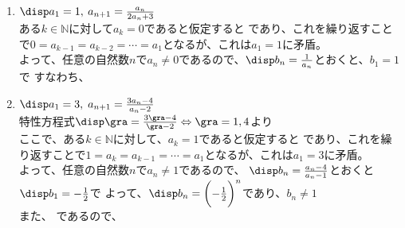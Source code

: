 \documentclass[a4paper]{ltjsarticle}
\begin{document}
\begin{question*}
\begin{ans*}
\begin{enumerate}[label=\arabic*.]
  \item $\disp a_1 = 1,\: a_{n+1} = \frac{a_n}{2a_n + 3}$ \bunsugyakusutikan \\
  ある$k\in \mathbb{N}$に対して$a_k = 0$であると仮定すると
  であり、これを繰り返すことで$0 = a_{k-1} = a_{k-2} = \cdots = a_1$となるが、これは$a_1 = 1$に矛盾。\\
  よって、任意の自然数$n$で$a_n \neq 0$であるので、$\disp b_n = \frac{1}{a_n}$とおくと、$b_1 = 1$で
  すなわち、

  \item $\disp a_1 = 3,\; a_{n+1} = \frac{3a_n-4}{a_n-2}$ \bunsutokusei \\
  特性方程式$\disp \gra =\frac{3\gra - 4}{\gra - 2} \Leftrightarrow \gra = 1,4$より \\
  ここで、ある$k\in \mathbb{N}$に対して、$a_k = 1$であると仮定すると
  であり、これを繰り返すことで$1 = a_k = a_{k-1} = \cdots = a_1$となるが、これは$a_1 = 3$に矛盾。\\
  よって、任意の自然数$n$で$a_n \neq 1$であるので、
  $\disp b_n = \frac{a_n - 4}{a_n - 1}$とおくと$\disp b_1 = -\frac{1}{2}$で
  よって、$\disp b_n = \biggl(-\frac{1}{2}\biggr)^n$であり、$b_n \neq 1$ \\
  また、
  であるので、


\end{enumerate}
\end{ans*}
\end{question*}
\end{document}
